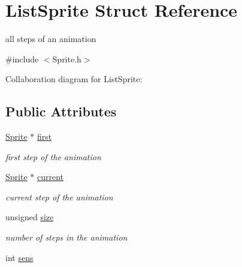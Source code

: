 \hypertarget{structListSprite}{}\section{List\+Sprite Struct Reference}
\label{structListSprite}


all steps of an animation  




{\ttfamily \#include $<$Sprite.\+h$>$}



Collaboration diagram for List\+Sprite\+:
\subsection*{Public Attributes}
\begin{DoxyCompactItemize}
\item 
\hyperlink{structSprite}{Sprite} $\ast$ \hyperlink{structListSprite_ad9a0c4aba9987a7a50986cfe6713dd1e}{first}\hypertarget{structListSprite_ad9a0c4aba9987a7a50986cfe6713dd1e}{}\label{structListSprite_ad9a0c4aba9987a7a50986cfe6713dd1e}

\begin{DoxyCompactList}\small\item\em first step of the animation \end{DoxyCompactList}\item 
\hyperlink{structSprite}{Sprite} $\ast$ \hyperlink{structListSprite_a3b1ab9fe7a6593fbe2767e7b2a7f6676}{current}\hypertarget{structListSprite_a3b1ab9fe7a6593fbe2767e7b2a7f6676}{}\label{structListSprite_a3b1ab9fe7a6593fbe2767e7b2a7f6676}

\begin{DoxyCompactList}\small\item\em current step of the animation \end{DoxyCompactList}\item 
unsigned \hyperlink{structListSprite_a6dd83abf2a154c0a4cc8887d7ffc20e3}{size}\hypertarget{structListSprite_a6dd83abf2a154c0a4cc8887d7ffc20e3}{}\label{structListSprite_a6dd83abf2a154c0a4cc8887d7ffc20e3}

\begin{DoxyCompactList}\small\item\em number of steps in the animation \end{DoxyCompactList}\item 
int \hyperlink{structListSprite_a2f28d2c699f6cf22ff8ebfed1d71fc75}{sens}\hypertarget{structListSprite_a2f28d2c699f6cf22ff8ebfed1d71fc75}{}\label{structListSprite_a2f28d2c699f6cf22ff8ebfed1d71fc75}


\end{DoxyCompactItemize}
